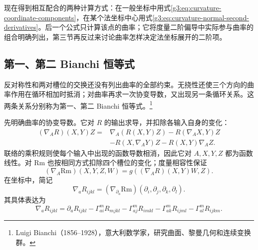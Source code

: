 现在得到相互配合的两种计算方式：在一般坐标中用式\eqref{g3:eq:curvature-coordinate-components}，在某个法坐标中心用式\eqref{g3:eq:curvature-normal-second-derivatives}。后一个公式只计算该点的曲率；它将度量二阶偏导中实际参与曲率的组合明确列出，第三节再反过来讨论曲率怎样决定法坐标展开的二阶项。

\subsection{第一、第二 Bianchi 恒等式}
\label{g3:subsec:0301:03}

反对称性和两对槽位的交换还没有列出曲率的全部约束。无挠性还使三个方向的曲率作用在循环相加时抵消；对曲率再求一次协变导数，又出现另一条循环关系。这两条关系分别称为第一、第二 Bianchi 恒等式。\footnote{Luigi Bianchi（1856--1928），意大利数学家，研究曲面、黎曼几何和连续变换群。}

\ProseParagraphBreak

先明确曲率的协变导数。它对 \(R\) 的输出求导，并扣除各输入自身的变化：
\begin{equation}\label{g3:eq:covariant-derivative-curvature}
	\begin{aligned}
		(\nabla_A R)(X,Y)Z
		={}&\nabla_A(R(X,Y)Z)-R(\nabla_AX,Y)Z\\
		&-R(X,\nabla_AY)Z-R(X,Y)\nabla_AZ.
	\end{aligned}
\end{equation}
联络的乘积规则使每个输入中出现的函数导数相消，因此它对 \(A,X,Y,Z\) 都为函数线性。对 \(\mathrm{Rm}\) 也按相同方式扣除四个槽位的变化；度量相容性保证
\[
	(\nabla_A\mathrm{Rm})(X,Y,Z,W)
	=g((\nabla_A R)(X,Y)W,Z).
\]
在坐标中，简记
\[
	\nabla_a R_{ijkl}
	=(\nabla_{\partial_a}\mathrm{Rm})
		(\partial_i,\partial_j,\partial_k,\partial_l).
\]
其具体表达为
\[
	\nabla_a R_{ijkl}
	=\partial_aR_{ijkl}
	-\Gamma^m_{ai}R_{mjkl}-\Gamma^m_{aj}R_{imkl}
	-\Gamma^m_{ak}R_{ijml}-\Gamma^m_{al}R_{ijkm}.
\]

